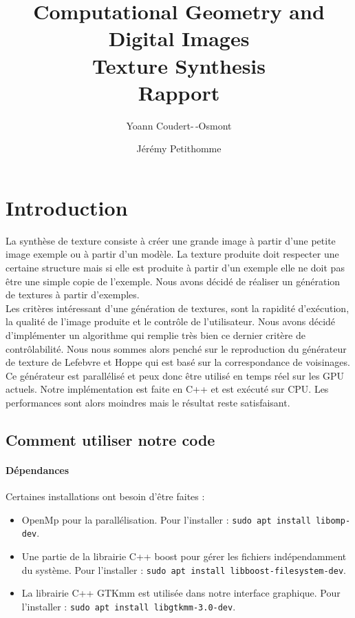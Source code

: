 \documentclass[12pt]{article}
\title{
	Computational Geometry and Digital Images\\
	\textbf{Texture Synthesis}\\
	Rapport
}
\author{
	Yoann Coudert-\,-Osmont
	\and
	Jérémy Petithomme
}
\begin{document}
	
\maketitle

\section{Introduction}
	
La synthèse de texture consiste à créer une grande image à partir d'une petite image exemple ou à partir d'un modèle. La texture produite doit respecter une certaine structure mais si elle est produite à partir d'un exemple elle ne doit pas être une simple copie de l'exemple. Nous avons décidé de réaliser un génération de textures à partir d'exemples. \\
Les critères intéressant d'une génération de textures, sont la rapidité d'exécution, la qualité de l'image produite et le contrôle de l'utilisateur. Nous avons décidé d'implémenter un algorithme qui remplie très bien ce dernier critère de contrôlabilité. Nous nous sommes alors penché sur le reproduction du générateur de texture de Lefebvre et Hoppe \cite{Lef++} qui est basé sur la correspondance de voisinages. Ce générateur est parallélisé et peux donc être utilisé en temps réel sur les GPU actuels. Notre implémentation est faite en C++ et est exécuté sur CPU. Les performances sont alors moindres mais le résultat reste satisfaisant.

\subsection{Comment utiliser notre code}

\paragraph{Dépendances}
Certaines installations ont besoin d'être faites :
\begin{itemize}
	\item OpenMp pour la parallélisation. Pour l'installer : \verb|sudo apt install libomp-dev|.
	\item Une partie de la librairie C++ boost pour gérer les fichiers indépendamment du système. Pour l'installer : \verb|sudo apt install libboost-filesystem-dev|.
	\item La librairie C++ GTKmm est utilisée dans notre interface graphique. Pour l'installer : \verb|sudo apt install libgtkmm-3.0-dev|.
\end{itemize}
\end{document}
